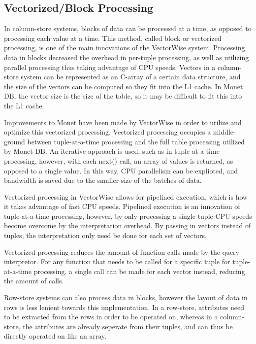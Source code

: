 \subsection*{Vectorized/Block Processing}


In column-store systems, blocks of data can be processed at a time, as opposed to processing each value at a time. This method, called block or vectorized processing, is one of the main innovations of the VectorWise system. Processing data in blocks decreased the overhead in per-tuple processing, as well as utilizing parallel processing thus taking advantage of CPU speeds\cite{colvsrow}. Vectors in a column-store system can be represented as an C-array of a certain data structure, and the size of the vectors can be computed so they fit into the L1 cache. In Monet DB, the vector size is the size of the table, so it may be difficult to fit this into the L1 cache\cite{now}. 


Improvements to Monet have been made by VectorWise in order to utilize and optimize this vectorized processing. Vectorized processing occupies a middle-ground between tuple-at-a-time processing and the full table processing utilized by Monet DB. An iterative approach is used, such as in tuple-at-a-time processing, however, with each next() call, an array of values is returned, as opposed to a single value\cite{colvsrow}. In this way, CPU parallelism can be explioted, and bandwidth is saved due to the smaller size of the batches of data.


Vectorized processing in VectorWise allows for pipelined execution, which is how it takes advantage of fast CPU speeds. Pipelined execution is an innovation of tuple-at-a-time processing, however, by only processing a single tuple CPU speeds become overcome by the interpretation overhead\cite{vectorwise}. By passing in vectors instead of tuples, the interpretation only need be done for each set of vectors.


Vectorized processing reduces the amount of function calls made by the query interpretor\cite{colvsrow}. For any function that needs to be called for a specific tuple for tuple-at-a-time processing, a single call can be made for each vector instead, reducing the amount of calls.


Row-store systems can also process data in blocks, however the layout of data in rows is less lenient towards this implementation. In a row-store, attributes need to be extracted from the rows in order to be operated on, whereas in a column-store, the attributes are already seperate from their tuples, and can thus be directly operated on like an array\cite{colvsrow}. 